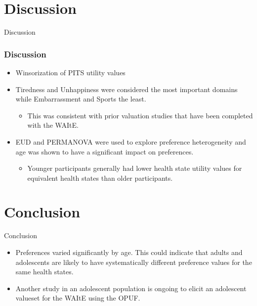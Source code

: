\documentclass[t,compress,9pt,aspectratio=169]{beamer}
\begin{document}
\section{Discussion}
\begin{frame}{Discussion}
    \frametitle{Discussion}
    \begin{itemize}
    \item Winsorization of PITS utility values
    \item Tiredness and Unhappiness were considered the most important domains while Embarrassment and Sports the least.
    \begin{itemize}
        \item This was consistent with prior valuation studies that have been completed with the WAItE.
    \end{itemize}
    \item EUD and PERMANOVA were used to explore preference heterogeneity and age was shown to have a significant impact on preferences.
    \begin{itemize}
        \item Younger participants generally had lower health state utility values for equivalent health states than older participants. 
    \end{itemize}
    \end{itemize}
\end{frame}

\section{Conclusion}
\begin{frame}{Conclusion}
    \begin{itemize}
        \item Preferences varied significantly by age. This could indicate that adults and adolescents are likely to have systematically different preference values for the same health states. 
        \item Another study in an adolescent population is ongoing to elicit an adolescent valueset for the WAItE using the OPUF.
    \end{itemize}
\end{frame}

\begin{frame}

\end{frame}






\end{document}
